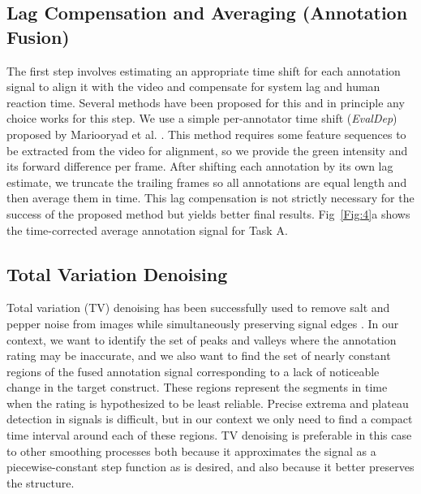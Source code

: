 \documentclass[10pt,letterpaper]{article}
\begin{document}
\subsection*{Lag Compensation and Averaging (Annotation Fusion)}
The first step involves estimating an appropriate time shift for each annotation signal to align it with the video and compensate for system lag and human reaction time.  Several methods have been proposed for this \cite{DTW2007, CTW2009, andrew2013deep, nicolaou2014dynamic, Mariooryad2015, Ringeval2015, trigeorgis2016deep} and in principle any choice works for this step.  We use a simple per-annotator time shift (\textit{EvalDep}) proposed by Mariooryad et al. \cite{Mariooryad2015}.  This method requires some feature sequences to be extracted from the video for alignment, so we provide the green intensity and its forward difference per frame.  After shifting each annotation by its own lag estimate, we truncate the trailing frames so all annotations are equal length and then average them in time. This lag compensation is not strictly necessary for the success of the proposed method but yields better final results. Fig~\ref{Fig:4}a shows the time-corrected average annotation signal for Task A.

\subsection*{Total Variation Denoising}
Total variation (TV) denoising has been successfully used to remove salt and pepper noise from images while simultaneously preserving signal edges \cite{rudin1992nonlinear}.  In our context, we want to identify the set of peaks and valleys where the annotation rating may be inaccurate, and we also want to find the set of nearly constant regions of the fused annotation signal corresponding to a lack of noticeable change in the target construct.  These regions represent the segments in time when the rating is hypothesized to be least reliable.  Precise extrema and plateau detection in signals is difficult, but in our context we only need to find a compact time interval around each of these regions.  TV denoising is preferable in this case to other smoothing processes both because it approximates the signal as a piecewise-constant step function as is desired, and also because it better preserves the structure.
\end{document}
